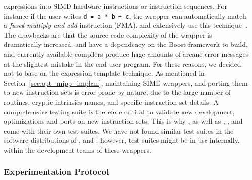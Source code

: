 expressions into SIMD hardware instructions or instruction sequences. For
instance if the user writes \verb|d = a * b + c|, the wrapper can automatically
match a \emph{fused multiply and add} instruction (FMA). \BoostSIMD and \bSIMD
extensively use this technique~\cite{Esterie2012,Esterie2012a}. The drawbacks
are that the source code complexity of the wrapper is dramatically increased.
\BoostSIMD and \bSIMD have a dependency on the Boost framework to build, and
currently available \Cxx compilers produce huge amounts of arcane error messages
at the slightest mistake in the end user program. For these reasons, we decided
not to base \MIPP on the expression template technique. As mentioned in
Section~\ref{sec:opt_mipp_implem}, maintaining SIMD wrappers, and porting them
to new instruction sets is error prone by nature, due to the large number of
routines, cryptic intrinsics names, and specific instruction set details. A
comprehensive testing suite is therefore critical to validate new development,
optimizations and ports on new instruction sets. This is why \MIPP, as well as
\Vc, \BoostSIMD, \simdpp and \bSIMD come with their own test suites. We have not
found similar test suites in the software distributions of \VCL, \xsimd and
\TSIMD; however, test suites might be in use internally, within the development
teams of these wrappers.

\subsubsection{Experimentation Protocol}
\label{sec:opt_mipp_protocol}

